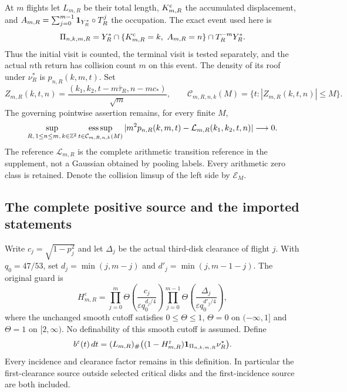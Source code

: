\documentclass[11pt,reqno]{amsart}
\numberwithin{equation}{section}
\theoremstyle{definition}
\theoremstyle{remark}\newtheorem{remark}[theorem]{Remark}
\newcommand{\esssup}{\operatorname*{ess\,sup}}
\begin{document}
At $m$ flights let $L_{m,R}$ be their total length, $K^{\rm c}_{m,R}$
the accumulated displacement, and
$A_{m,R}=\sum_{j=0}^{m-1}\mathbf1_{Y_R^*}\circ T_R^j$ the occupation.
The exact event used here is
\[
 \Pi_{n,k,m,R}=Y_R^*\cap\{K^{\rm c}_{m,R}=k,\ A_{m,R}=n\}
                            \cap T_R^{-m}Y_R^*.
\]
Thus the initial visit is counted, the terminal visit is tested separately,
and the actual $n$th return has collision count $m$ on this event.
The density of its roof under $\nu_R^*$ is $p_{n,R}(k,m,t)$.
Set
\[
 Z_{m,R}(k,t,n)=\frac{(k_1,k_2,t-m\bar\tau_R,n-mc_*)}{\sqrt m},
 \qquad \mathcal C_{m,R,n,k}(M)=\{t:|Z_{m,R}(k,t,n)|\le M\}.
\]
The governing pointwise assertion remains, for every finite $M$,
\begin{equation}\label{eq:v75-original-target}
 \sup_{R,\,1\le n\le m,\,k\in\Z^2}
 \esssup_{t\in\mathcal C_{m,R,n,k}(M)}
 |m^2p_{n,R}(k,m,t)-\mathcal L_{m,R}(k_1,k_2,t,n)|\longrightarrow0.
\end{equation}
The reference $\mathcal L_{m,R}$ is the complete arithmetic transition
reference in the supplement, not a Gaussian obtained by pooling labels.
Every arithmetic zero class is retained. Denote the collision limsup
of the left side by $\mathcal E_M$.

\subsection{The complete positive source and the imported statements}
Write $c_j=\sqrt{1-p_j^2}$ and let $\Delta_j$ be the actual
third-disk clearance of flight $j$. With $q_0=47/53$, set
$d_j=\min(j,m-j)$ and $d'_j=\min(j,m-1-j)$. The original guard is
\[
 H_{m,R}^\varepsilon=
 \prod_{j=0}^{m}\Theta\!\left(\frac{c_j}{\varepsilon q_0^{d_j/4}}\right)
 \prod_{j=0}^{m-1}\Theta\!\left(\frac{\Delta_j}{\varepsilon q_0^{d'_j/4}}\right),
\]
where the unchanged smooth cutoff satisfies $0\le\Theta\le1$,
$\Theta=0$ on $(-\infty,1]$ and $\Theta=1$ on $[2,\infty)$.
No definability of this smooth cutoff is assumed. Define
\begin{equation}\label{eq:v75-source}
 b^\varepsilon(t)\,dt
   =(L_{m,R})_\#\bigl((1-H_{m,R}^\varepsilon)
                         \mathbf1_{\Pi_{n,k,m,R}}\nu_R^*\bigr).
\end{equation}
Every incidence and clearance factor remains in this definition.
In particular the first-clearance source outside selected critical
disks and the first-incidence source are both included.
\end{document}
